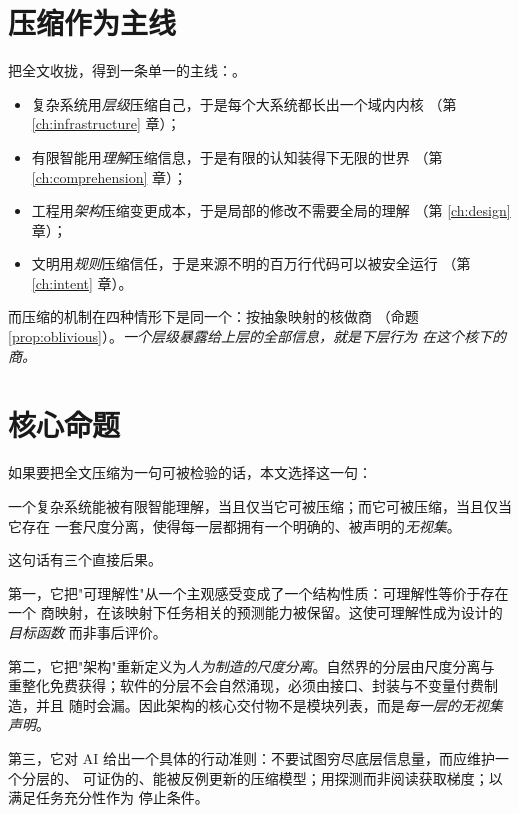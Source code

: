 \section{压缩作为主线}

把全文收拢，得到一条单一的主线：。

\begin{itemize}
\item 复杂系统用\emph{层级}压缩自己，于是每个大系统都长出一个域内内核
      （第 \ref{ch:infrastructure} 章）；
\item 有限智能用\emph{理解}压缩信息，于是有限的认知装得下无限的世界
      （第 \ref{ch:comprehension} 章）；
\item 工程用\emph{架构}压缩变更成本，于是局部的修改不需要全局的理解
      （第 \ref{ch:design} 章）；
\item 文明用\emph{规则}压缩信任，于是来源不明的百万行代码可以被安全运行
      （第 \ref{ch:intent} 章）。
\end{itemize}

而压缩的机制在四种情形下是同一个：按抽象映射的核做商
（命题 \ref{prop:oblivious}）。\emph{一个层级暴露给上层的全部信息，就是下层行为
在这个核下的商。}

\section{核心命题}

如果要把全文压缩为一句可被检验的话，本文选择这一句：

\begin{principle}[核心命题]\label{pr:core}
一个复杂系统能被有限智能理解，当且仅当它可被压缩；而它可被压缩，当且仅当它存在
一套尺度分离，使得每一层都拥有一个明确的、被声明的\emph{无视集}。
\end{principle}

这句话有三个直接后果。

第一，它把"可理解性"从一个主观感受变成了一个结构性质：可理解性等价于存在一个
商映射，在该映射下任务相关的预测能力被保留。这使可理解性成为设计的\emph{目标函数}
而非事后评价。

第二，它把"架构"重新定义为\emph{人为制造的尺度分离}。自然界的分层由尺度分离与
重整化免费获得；软件的分层不会自然涌现，必须由接口、封装与不变量付费制造，并且
随时会漏。因此架构的核心交付物不是模块列表，而是\emph{每一层的无视集声明}。

第三，它对 AI 给出一个具体的行动准则：不要试图穷尽底层信息量，而应维护一个分层的、
可证伪的、能被反例更新的压缩模型；用探测而非阅读获取梯度；以满足任务充分性作为
停止条件。

